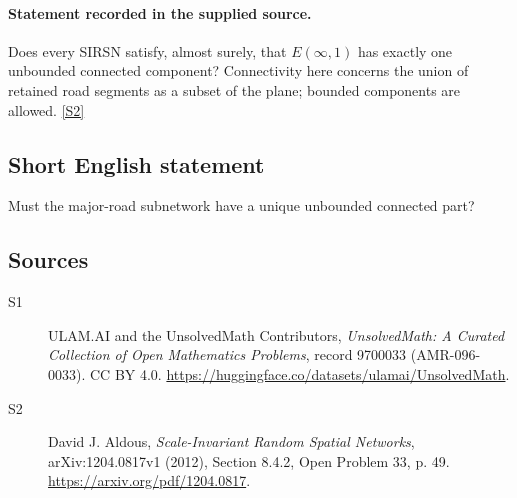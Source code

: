 \documentclass[11pt]{article}
\newcommand{\sref}[2]{\hyperlink{source:#1:#2}{[S#2]}}
\begin{document}
\paragraph{Statement recorded in the supplied source.}
Does every SIRSN satisfy, almost surely, that $E(\infty,1)$ has exactly one unbounded connected component? Connectivity here concerns the union of retained road segments as a subset of the plane; bounded components are allowed. \sref{9700033}{2}
\subsection{Short English statement}
Must the major-road subnetwork have a unique unbounded connected part?
\subsection{Sources}
\begin{description}
\item[\hypertarget{source:9700033:1}{S1}] ULAM.AI and the UnsolvedMath Contributors, \emph{UnsolvedMath: A Curated Collection of Open Mathematics Problems}, record 9700033 (AMR-096-0033). CC BY 4.0. \url{https://huggingface.co/datasets/ulamai/UnsolvedMath}.
\item[\hypertarget{source:9700033:2}{S2}] David J. Aldous, \emph{Scale-Invariant Random Spatial Networks}, arXiv:1204.0817v1 (2012), Section 8.4.2, Open Problem 33, p. 49. \url{https://arxiv.org/pdf/1204.0817}.
\end{description}
\label{end:9700033}
\end{document}
